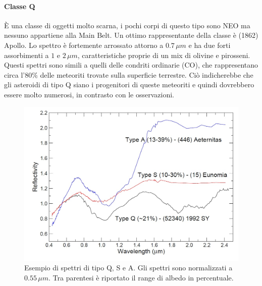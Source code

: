 \documentclass[a4paper,11pt,openright]{book}
\begin{document}
\paragraph*{Classe Q}
È una classe di oggetti molto scarna, i pochi corpi di questo tipo sono NEO ma nessuno appartiene alla Main Belt. Un ottimo rappresentante della classe è (1862) Apollo. Lo spettro è fortemente arrossato attorno a $0.7\,\mu m$ e ha due forti assorbimenti a $1$ e $2\,\mu m$, caratteristiche proprie di un mix di olivine e pirosseni.\\
Questi spettri sono simili a quelli delle condriti ordinarie (CO), che rappresentano circa l'80\% delle meteoriti trovate sulla superficie terrestre. Ciò indicherebbe che gli asteroidi di tipo Q siano i progenitori di queste meteoriti e quindi dovrebbero essere molto numerosi, in contrasto con le osservazioni.

\begin{figure}[!h]
\centering
\includegraphics[scale=0.3]{figure/spettro_qsa.jpg}
\caption[Esempio di spettri di tipo Q, S e A.]{Esempio di spettri di tipo Q, S e A. Gli spettri sono normalizzati a $0.55\,\mu m$. Tra parentesi è riportato il range di albedo in percentuale. \citep{magrin_spectroscopic_nodate}}
\label{spettro_qsa}
\end{figure}
\end{document}
